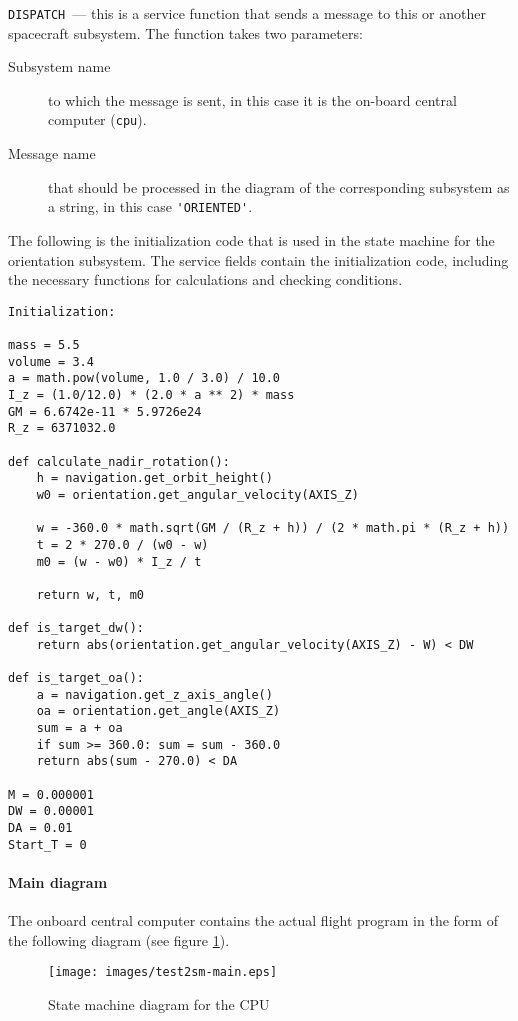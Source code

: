 \documentclass[12pt,a4paper]{article}
\begin{document}
\verb'DISPATCH'~--- this is a service function that sends a message to this or another spacecraft subsystem.  The function takes two parameters:

\begin{description}
\item[Subsystem name] to which the message is sent, in this case it is the on-board central computer
  (\verb'cpu').
\item[Message name] that should be processed in the diagram of the corresponding subsystem as a string, in this case \verb"'ORIENTED'".
\end{description}

The following is the initialization code that is used in the state machine for the orientation subsystem. The service fields contain the initialization code, including the necessary
functions for calculations and checking conditions.

\begin{verbatim}
Initialization:

mass = 5.5
volume = 3.4
a = math.pow(volume, 1.0 / 3.0) / 10.0
I_z = (1.0/12.0) * (2.0 * a ** 2) * mass
GM = 6.6742e-11 * 5.9726e24
R_z = 6371032.0

def calculate_nadir_rotation():
    h = navigation.get_orbit_height()
    w0 = orientation.get_angular_velocity(AXIS_Z)

    w = -360.0 * math.sqrt(GM / (R_z + h)) / (2 * math.pi * (R_z + h))
    t = 2 * 270.0 / (w0 - w)
    m0 = (w - w0) * I_z / t

    return w, t, m0

def is_target_dw():
    return abs(orientation.get_angular_velocity(AXIS_Z) - W) < DW

def is_target_oa():
    a = navigation.get_z_axis_angle()
    oa = orientation.get_angle(AXIS_Z)
    sum = a + oa
    if sum >= 360.0: sum = sum - 360.0
    return abs(sum - 270.0) < DA

M = 0.000001
DW = 0.00001
DA = 0.01
Start_T = 0
\end{verbatim}

\paragraph{Main diagram} The onboard central computer contains the actual flight program in the form of the following diagram (see figure \ref{Pic:Test2SM-Main}).

\begin{figure}[tbh]
  \begin{center}
    \texttt{[image: images/test2sm-main.eps]}
    \caption{State machine diagram for the CPU}
    \label{Pic:Test2SM-Main}
  \end{center}
\end{figure}
\end{document}
